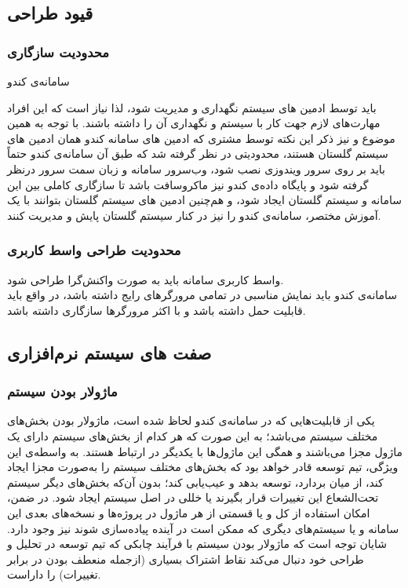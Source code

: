 \documentclass{report}
\begin{document}
\subsection{قیود طراحی}
\subsubsection{محدودیت سازگاری}
\hypertarget{gg}{سامانه‌ی کندو}
باید توسط ادمین های سیستم نگهداری و مدیریت شود، لذا نیاز است که این افراد مهارت‌های لازم جهت کار با سیستم و نگهداری آن را داشته باشند. با توجه به همین موضوع و نیز ذکر این نکته توسط مشتری که ادمین های سامانه کندو همان ادمین های سیستم گلستان هستند، محدودیتی در نظر گرفته شد که طبق آن سامانه‌ی کندو حتماً باید بر روی سرور ویندوزی نصب شود، وب‌سرور سامانه 
 و زبان سمت سرور
درنظر گرفته شود و پایگاه داده‌ی کندو نیز
ماکروسافت باشد تا سازگاری کاملی بین این سامانه و سیستم گلستان ایجاد شود، و هم‌چنین ادمین های سیستم گلستان بتوانند با یک آموزش مختصر، سامانه‌ی کندو را نیز در کنار سیستم گلستان پایش و مدیریت کنند.

\subsubsection{محدودیت طراحی واسط کاربری}
واسط کاربری سامانه باید به صورت واکنش‌گرا 
طراحی شود.\\
سامانه‌ی کندو باید نمایش مناسبی در تمامی مرورگرهای رایج داشته باشد، در واقع باید قابلیت حمل داشته باشد و با اکثر مرورگرها سازگاری 
 داشته باشد.

\subsection{صفت های ‌سیستم نرم‌افزاری}
\subsubsection{ماژولار بودن سیستم}
یکی از قابلیت‌هایی که در سامانه‌ی کندو لحاظ شده است، ماژولار بودن بخش‌های مختلف سیستم می‌باشد؛ به این صورت که هر کدام از بخش‌های سیستم دارای یک ماژول مجزا می‌باشند و همگی این ماژول‌ها با یکدیگر در ارتباط هستند. به واسطه‌ی این ویژگی، تیم توسعه قادر خواهد بود که بخش‌های مختلف سیستم را به‌صورت مجزا ایجاد کند، از میان بردارد، توسعه بدهد و عیب‌یابی کند؛ بدون آن‌که بخش‌های دیگر سیستم تحت‌الشعاع این تغییرات قرار بگیرند یا خللی در اصل سیستم ایجاد شود. در ضمن، امکان استفاده از کل و یا قسمتی از هر ماژول در پروژه‌ها و نسخه‌های بعدی این سامانه و یا سیستم‌های دیگری که ممکن است در آینده پیاده‌سازی شوند نیز وجود دارد. شایان توجه است که ماژولار بودن سیستم با فرآیند چابکی که تیم توسعه در تحلیل و طراحی خود دنبال می‌کند نقاط اشتراک بسیاری (ازجمله منعطف بودن در برابر تغییرات) را داراست.
\end{document}
